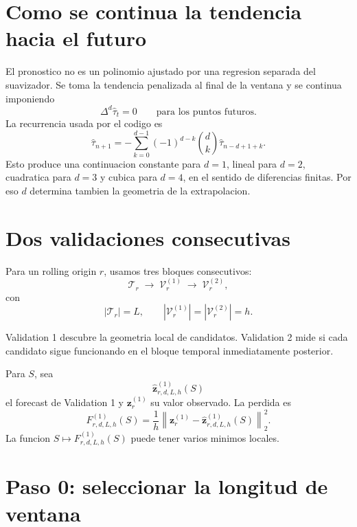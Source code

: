 \documentclass[11pt]{article}
\newcommand{\D}{\Delta}
\begin{document}
\section{Como se continua la tendencia hacia el futuro}

El pronostico no es un polinomio ajustado por una regresion separada del
suavizador. Se toma la tendencia penalizada al final de la ventana y se
continua imponiendo
\begin{equation}
\D^d\widehat{\tau}_t=0
\qquad
\text{para los puntos futuros}.
\label{eq:zero-difference}
\end{equation}
La recurrencia usada por el codigo es
\begin{equation}
\widehat{\tau}_{n+1}
=
-
\sum_{k=0}^{d-1}
(-1)^{d-k}
\binom{d}{k}
\widehat{\tau}_{n-d+1+k}.
\label{eq:continuation}
\end{equation}
Esto produce una continuacion constante para \(d=1\), lineal para \(d=2\),
cuadratica para \(d=3\) y cubica para \(d=4\), en el sentido de diferencias
finitas. Por eso \(d\) determina tambien la geometria de la extrapolacion.

\section{Dos validaciones consecutivas}

Para un rolling origin \(r\), usamos tres bloques consecutivos:
\[
\boxed{\mathcal{T}_r}
\;\longrightarrow\;
\boxed{\mathcal{V}^{(1)}_r}
\;\longrightarrow\;
\boxed{\mathcal{V}^{(2)}_r},
\]
con
\[
|\mathcal{T}_r|=L,
\qquad
|\mathcal{V}^{(1)}_r|
=
|\mathcal{V}^{(2)}_r|
=
h.
\]

Validation 1 descubre la geometria local de candidatos. Validation 2 mide si
cada candidato sigue funcionando en el bloque temporal inmediatamente
posterior.

Para \(S\), sea
\[
\widehat{\bm z}^{(1)}_{r,d,L,h}(S)
\]
el forecast de Validation 1 y \(\bm z^{(1)}_r\) su valor observado. La perdida
es
\begin{equation}
F^{(1)}_{r,d,L,h}(S)
=
\frac{1}{h}
\left\|
\bm z^{(1)}_r
-
\widehat{\bm z}^{(1)}_{r,d,L,h}(S)
\right\|_2^2.
\label{eq:val1}
\end{equation}
La funcion \(S\mapsto F^{(1)}_{r,d,L,h}(S)\) puede tener varios minimos
locales.

\section{Paso 0: seleccionar la longitud de ventana}
\end{document}
